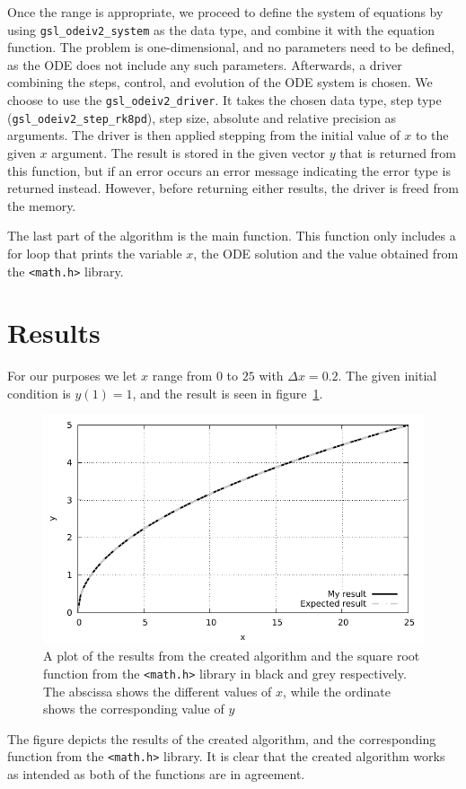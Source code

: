 \documentclass[12pt, twocolumn]{article}
\begin{document}
Once the range is appropriate, we proceed to define the system of equations by using \texttt{gsl\_odeiv2\_system} as the data type, and combine it with the equation function. The problem is one-dimensional, and no parameters need to be defined, as the ODE does not include any such parameters. Afterwards, a driver  combining the steps, control, and evolution of the ODE system is chosen. We choose to use the \texttt{gsl\_odeiv2\_driver}. It takes the chosen data type, step type (\texttt{gsl\_odeiv2\_step\_rk8pd}), step size, absolute and relative precision as arguments. The driver is then applied stepping from the initial value of $x$ to the given $x$ argument. The result is stored in the given vector $y$ that is returned from this function, but if an error occurs an error message indicating the error type is returned instead. However, before returning either results, the driver is freed from the memory.

The last part of the algorithm is the main function. This function only includes a for loop that prints the variable $x$, the ODE solution and the value obtained from the \texttt{<math.h>} library. 


\section{Results} \label{sec:results}

For our purposes we let $x$ range from $0$ to $25$ with $\Delta x = 0.2$. The given initial condition is $y(1) = 1$, and the result is seen in figure~\ref{fig:sqrt}. 
\begin{figure}[ht]
    \centering
    \includegraphics[width=\columnwidth]{plot.pdf}
    \caption{A plot of the results from the created algorithm and the square root function from the \texttt{<math.h>} library in black and grey respectively. The abscissa shows the different values of $x$, while the ordinate shows the corresponding value of $y$}
    \label{fig:sqrt}
\end{figure}
The figure depicts the results of the created algorithm, and the corresponding function from the \texttt{<math.h>} library. It is clear that the created algorithm works as intended as both of the functions are in agreement. 

\printbibliography
\end{document}
